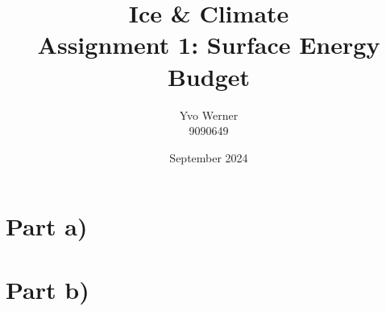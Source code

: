 \documentclass{article}
\title{Ice \& Climate \\ \vspace{1em} \large Assignment 1: Surface Energy Budget \normalsize}
\author{Yvo Werner\\ 9090649 }
\date{September 2024}
\begin{document}
\maketitle

\section*{Part a)}



\section*{Part b)}







% 
\end{document}
